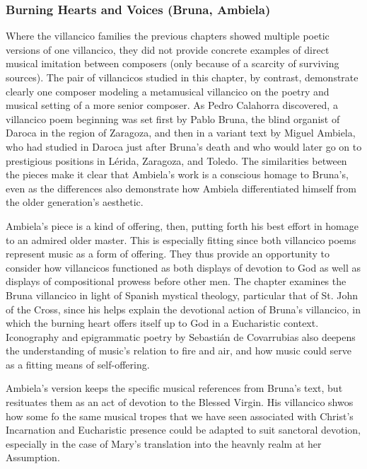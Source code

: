 \documentclass[tt]{vcbook-proposal}
\begin{document}
\subsubsection{Burning Hearts and Voices (Bruna, Ambiela)}

Where the villancico families the previous chapters showed multiple poetic versions of one villancico, they did not provide concrete examples of direct musical imitation between composers (only because of a scarcity of surviving sources).
The pair of villancicos studied in this chapter, by contrast, demonstrate clearly one composer modeling a metamusical villancico on the poetry and musical setting of a more senior composer.
As Pedro Calahorra discovered, a villancico poem beginning  was set first by Pablo Bruna, the blind organist of Daroca in the region of Zaragoza, and then in a variant text by Miguel Ambiela, who had studied in Daroca just after Bruna's death and who would later go on to prestigious positions in Lérida, Zaragoza, and Toledo.
The similarities between the pieces make it clear that Ambiela's work is a conscious homage to Bruna's, even as the differences also demonstrate how Ambiela differentiated himself from the older generation's aesthetic. 

Ambiela's piece is a kind of offering, then, putting forth his best effort in homage to an admired older master.
This is especially fitting since both villancico poems represent music as a form of offering.
They thus provide an opportunity to consider how villancicos functioned as both displays of devotion to God as well as displays of compositional prowess before other men.
The chapter examines the Bruna villancico in light of Spanish mystical theology, particular that of St. John of the Cross, since his  helps explain the devotional action of Bruna's villancico, in which the burning heart offers itself up to God in a Eucharistic context.
Iconography and epigrammatic poetry by Sebastián de Covarrubias also deepens the understanding of music's relation to fire and air, and how music could serve as a fitting means of self-offering.

Ambiela's version keeps the specific musical references from Bruna's text, but resituates them as an act of devotion to the Blessed Virgin.
His villancico shwos how some fo the same musical tropes that we have seen associated with Christ's Incarnation and Eucharistic presence could be adapted to suit sanctoral devotion, especially in the case of Mary's translation into the heavnly realm at her Assumption.
\end{document}
